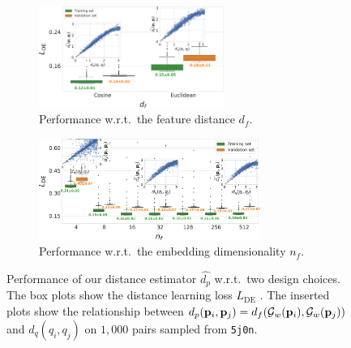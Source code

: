 \begin{figure}[ht]
    \centering
    \begin{subfigure}[t]{0.44\linewidth}
        \centering
        \includegraphics[height=3.3cm]{figures/dPdQ_feat_distances.pdf}
        \caption{%
            Performance w.r.t.\ the feature distance $d_f$.
        }\label{fig:geo-eucl-mlp}
    \end{subfigure}
    \hfill
    \begin{subfigure}[t]{0.53\linewidth}
        \centering
        \includegraphics[height=3.3cm]{figures/de_nf.pdf}
        \caption{%
            Performance w.r.t.\ the embedding dimensionality $n_f$.
        }\label{fig:4d-vs-256d-de}
    \end{subfigure}
        \caption{%
            Performance of our distance estimator $\widehat{d_p}$ w.r.t.\ two design choices.
            The box plots show the distance learning loss $L_\text{DE}$ .
            The inserted plots show the relationship between $d_p(\mathbf{p}_i, \mathbf{p}_j) = d_f(\mathcal{G}_w(\mathbf{p}_i), \mathcal{G}_w(\mathbf{p}_j))$ and $d_q(q_i, q_j)$ on $1,000$ pairs sampled from \texttt{5j0n}.
        }
\end{figure}

